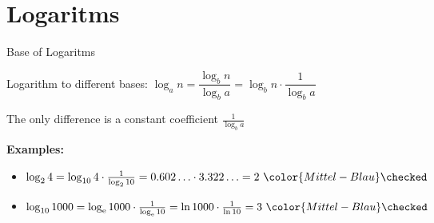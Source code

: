 \section{Logaritms}

\begin{frame}{Base of Logaritms}
  \begin{block}{Logarithm to different bases:}
    $\log_a n = \dfrac{\log_b n}{\log_b a} = \log_b n \cdot \dfrac{1}{\log_b a}$
    
    The only difference is a constant coefficient $\frac{1}{\log_b a}$
  \end{block}
  \textbf{Examples:}
  \begin{itemize}
    \item
      $\log_2 4 = \log_{10} 4 \cdot \frac{1}{\log_2 10} = 0.602 \ldots \cdot 3.322 \ldots
      = 2 ~{\color{Mittel-Blau}\checked}$
      \item
      $\log_{10} 1000 = \log_{\mathrm{e}} 1000 \cdot \frac{1}{\log_{\mathrm{e}} 10}
      = \ln 1000 \cdot \frac{1}{\ln 10}
      = 3 ~{\color{Mittel-Blau}\checked}$
  \end{itemize}
\end{frame}
